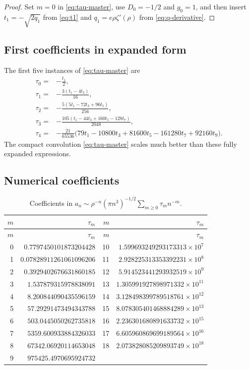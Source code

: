 \documentclass[11pt,oneside]{article}
\numberwithin{equation}{section}
\theoremstyle{plain}
\theoremstyle{definition}
\theoremstyle{remark}
\begin{document}
\begin{proof}
Set $m=0$ in \eqref{eq:tau-master}, use $D_0=-1/2$ and $g_0=1$, and then
insert $t_1=-\sqrt{2q_1}$ from \eqref{eq:t1} and
$q_1=e\rho\zeta'(\rho)$ from \eqref{eq:q-derivative}.
\end{proof}

\subsection{First coefficients in expanded form}

The first five instances of \eqref{eq:tau-master} are
\begin{align}
 \tau_0={}&-\frac{t_1}{2},\label{eq:tau0-explicit}\\
 \tau_1={}&-\frac{3(t_1-4t_3)}{16},\label{eq:tau1-explicit}\\
 \tau_2={}&-\frac{5(5t_1-72t_3+96t_5)}{256},\label{eq:tau2-explicit}\\
 \tau_3={}&-\frac{105(t_1-44t_3+160t_5-128t_7)}{2048},
 \label{eq:tau3-explicit}\\
 \tau_4={}&-\frac{21}{65536}
 \bigl(79t_1-10800t_3+81600t_5-161280t_7+92160t_9\bigr).
 \label{eq:tau4-explicit}
\end{align}
The compact convolution \eqref{eq:tau-master} scales much better than these
fully expanded expressions.

\subsection{Numerical coefficients}

\begin{longtable}{@{}r@{\quad}r@{\qquad}r@{\quad}r@{}}
\caption{Coefficients in
$a_n\sim\rho^{-n}(\pi n^3)^{-1/2}\sum_{m\ge0}\tau_mn^{-m}$.}
\label{tab:tau-coefficients}\\
\toprule
$m$ & $\tau_m$ & $m$ & $\tau_m$\\
\midrule
\endfirsthead
\toprule
$m$ & $\tau_m$ & $m$ & $\tau_m$\\
\midrule
\endhead
0  & $0.7797450101873204428$ & 10 & $1.599693249293173313\times10^{7}$\\
1  & $0.07828911261061096206$ & 11 & $2.928225313353392231\times10^{8}$\\
2  & $0.3929402676631860185$ & 12 & $5.914523441293932519\times10^{9}$\\
3  & $1.537879315978838091$ & 13 & $1.305991927898971332\times10^{11}$\\
4  & $8.200844090435596159$ & 14 & $3.128498399789518761\times10^{12}$\\
5  & $57.29291473494343788$ & 15 & $8.078305401468884289\times10^{13}$\\
6  & $503.0445050262735818$ & 16 & $2.236301680891633732\times10^{15}$\\
7  & $5359.600933884326033$ & 17 & $6.605960869699189564\times10^{16}$\\
8  & $67342.06920114653048$ & 18 & $2.073828085209893749\times10^{18}$\\
9  & $975425.4970695924732$ & & \\
\bottomrule
\end{longtable}
\end{document}
